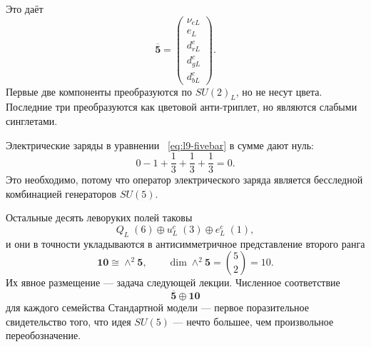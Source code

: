 Это даёт
\begin{equation}
\overline{\mathbf5}
=
\begin{pmatrix}
\nu_{eL}\\
e_L\\
d^c_{rL}\\
d^c_{gL}\\
d^c_{bL}
\end{pmatrix}.
\label{eq:l9-fivebar}
\end{equation}
Первые две компоненты преобразуются по \(SU(2)_L\), но не несут цвета. Последние три преобразуются как цветовой анти-триплет, но являются слабыми синглетами.

\begin{classroomqa}
\end{classroomqa}

Электрические заряды в уравнении ~\eqref{eq:l9-fivebar} в сумме дают нуль:
\begin{equation}
0-1+\frac13+\frac13+\frac13=0.
\label{eq:l9-fivebar-charge-sum}
\end{equation}
Это необходимо, потому что оператор электрического заряда является бесследной комбинацией генераторов \(SU(5)\).

\begin{classroomqa}
\end{classroomqa}

Остальные десять леворуких полей таковы
\begin{equation}
Q_L\;(6)
\oplus
u^c_L\;(3)
\oplus
e^c_L\;(1),
\end{equation}
и они в точности укладываются в антисимметричное представление второго ранга
\begin{equation}
\mathbf{10}\cong\wedge^2\mathbf5,
\qquad
\dim\wedge^2\mathbf5=\binom52=10.
\label{eq:l9-ten-preview}
\end{equation}
Их явное размещение — задача следующей лекции. Численное соответствие
\begin{equation}
\overline{\mathbf5}\oplus\mathbf{10}
\end{equation}
для каждого семейства Стандартной модели — первое поразительное свидетельство того, что идея \(SU(5)\) — нечто большее, чем произвольное переобозначение.

